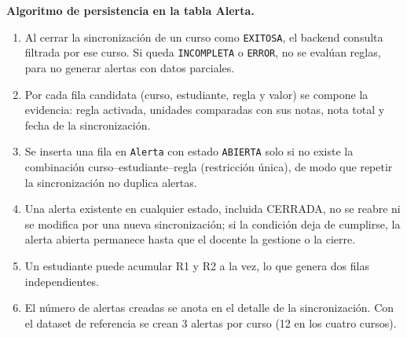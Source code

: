 \documentclass[11pt,a4paper]{article}
\begin{document}
\textbf{Algoritmo de persistencia en la tabla Alerta.}
\begin{enumerate}
  \item Al cerrar la sincronización de un curso como \texttt{EXITOSA}, el backend consulta  filtrada por ese curso. Si queda \texttt{INCOMPLETA} o \texttt{ERROR}, no se evalúan reglas, para no generar alertas con datos parciales.
  \item Por cada fila candidata (curso, estudiante, regla y valor) se compone la evidencia: regla activada, unidades comparadas con sus notas, nota total y fecha de la sincronización.
  \item Se inserta una fila en \texttt{Alerta} con estado \texttt{ABIERTA} solo si no existe la combinación curso--estudiante--regla (restricción única), de modo que repetir la sincronización no duplica alertas.
  \item Una alerta existente en cualquier estado, incluida CERRADA, no se reabre ni se modifica por una nueva sincronización; si la condición deja de cumplirse, la alerta abierta permanece hasta que el docente la gestione o la cierre.
  \item Un estudiante puede acumular R1 y R2 a la vez, lo que genera dos filas independientes.
  \item El número de alertas creadas se anota en el detalle de la sincronización. Con el dataset de referencia se crean 3 alertas por curso (12 en los cuatro cursos).
\end{enumerate}
\end{document}

